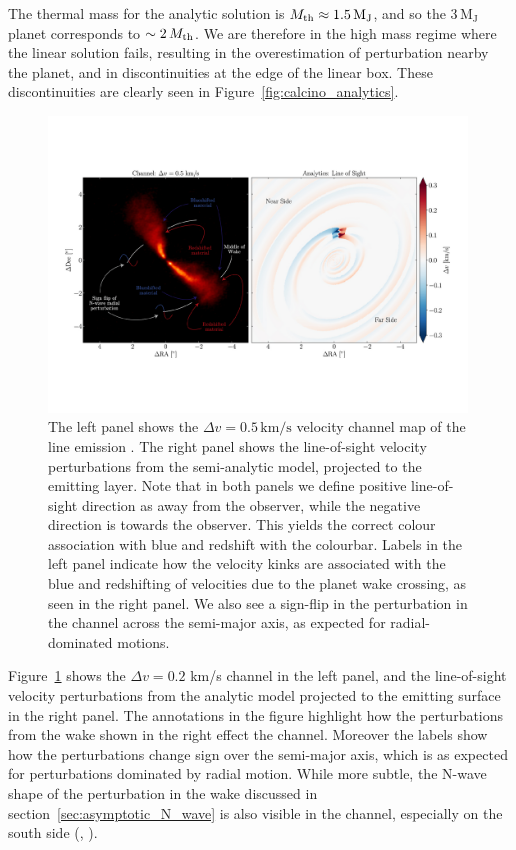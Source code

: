 The thermal mass for the analytic solution is $M_{\rm th} \approx 1.5 \, \mathrm{M_J}$, and so the $3 \, \mathrm{M_J}$ planet corresponds to $\sim 2 \, M_{\rm th}$.
We are therefore in the high mass regime where the linear solution fails, resulting in the overestimation of perturbation nearby the planet, and in discontinuities at the edge of the linear box.
These discontinuities are clearly seen in Figure~\ref{fig:calcino_analytics}.

\begin{figure}
    \centering
    \includegraphics[width = 0.99\textwidth]{figures/calcino_channel_comparison.pdf}
    \caption{The left panel shows the $\Delta v = 0.5 \, \mathrm{km/s}$ velocity channel map of the line emission \citep{oberg2021}. The right panel shows the line-of-sight velocity perturbations from the semi-analytic model, projected to the emitting layer. Note that in both panels we define positive line-of-sight direction as away from the observer, while the negative direction is towards the observer. This yields the correct colour association with blue and redshift with the colourbar. Labels in the left panel indicate how the velocity kinks are associated with the blue and redshifting of velocities due to the planet wake crossing, as seen in the right panel. We also see a sign-flip in the perturbation in the channel across the semi-major axis, as expected for radial-dominated motions.}
    \label{fig:calcino_channel_comparison}
\end{figure}

Figure~\ref{fig:calcino_channel_comparison} shows the  $\Delta v = 0.2$ km/s channel in the left panel, and the line-of-sight velocity perturbations from the analytic model projected to the emitting surface in the right panel.
The annotations in the figure highlight how the perturbations from the wake shown in the right effect the channel.
Moreover the labels show how the perturbations change sign over the semi-major axis, which is as expected for perturbations dominated by radial motion.
While more subtle, the N-wave shape of the perturbation in the wake discussed in section~\ref{sec:asymptotic_N_wave} is also visible in the channel, especially on the south side (\citealt{rafikov2002a}, ).

